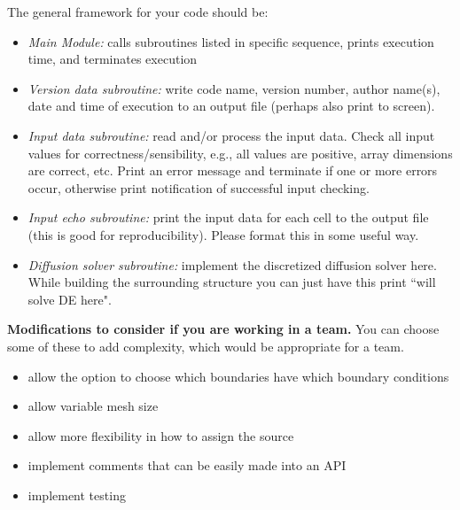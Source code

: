 \documentclass[12pt]{article}
\begin{document}
The general framework for your code should be:
\begin{itemize}
\item \textit{Main Module:} calls subroutines listed in specific sequence, prints execution time, and terminates execution

\item \textit{Version data subroutine:} write code name, version number, author name(s), date and time of execution to an output file (perhaps also print to screen).

\item \textit{Input data subroutine:} read and/or process the input data. Check all input values for correctness/sensibility, e.g., all values are positive, array dimensions are correct, etc. Print an error message and terminate if one or more errors occur, otherwise print notification of successful input checking. 

\item \textit{Input echo subroutine:} print the input data for each cell to the output file (this is good for reproducibility). Please format this in some useful way.

\item \textit{Diffusion solver subroutine:} implement the discretized diffusion solver here. While building the surrounding structure you can just have this print ``will solve DE here". 

\end{itemize}

\textbf{Modifications to consider if you are working in a team.} You can choose some of these to add complexity, which would be appropriate for a team. 
\begin{itemize}
\item allow the option to choose which boundaries have which boundary conditions
\item allow  variable mesh size
\item allow more flexibility in how to assign the source
\item implement comments that can be easily made into an API
\item implement testing
\end{itemize}
\end{document}
